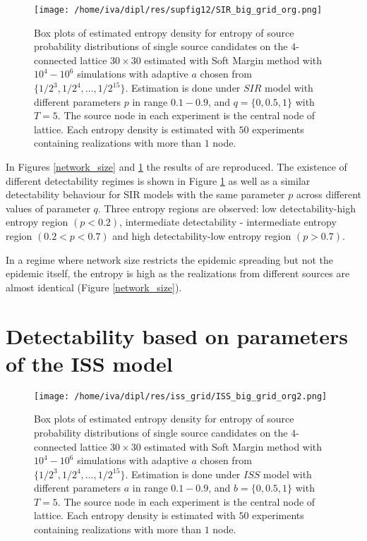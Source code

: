 \documentclass[times, utf8, diplomski]{fer}
\begin{document}
\begin{figure}[H]
\texttt{[image: /home/iva/dipl/res/supfig12/SIR\_big\_grid\_org.png]}
\caption{Box plots of estimated entropy density for entropy of source probability distributions of 
single source candidates on the $4$-connected lattice $30 \times 30$ estimated with Soft Margin method with $10^4 - 10^6$ simulations with adaptive $a$ chosen from $\{1/2^3, 1/2^4, \ldots, 1/2^{15}\}$. Estimation is done under $SIR$ model with different parameters $p$ in range $0.1 - 0.9$, and $q = \{0, 0.5, 1\}$ with $T = 5$. The source node in each experiment is the central node of lattice. Each entropy density is estimated with $50$ experiments containing realizations with more than $1$ node.}
\label{entropy_zones}
\end{figure}

In Figures \ref{network_size} and \ref{entropy_zones} the results of \cite{Nino} are reproduced. The existence of different detectability regimes is shown in Figure \ref{entropy_zones} as well as a similar detectability behaviour for SIR models with the same parameter $p$ across different values of parameter $q$.  Three entropy regions are observed: low detectability-high entropy region $(p < 0.2)$, intermediate detectability - intermediate entropy region $(0.2 < p < 0.7)$ and high detectability-low entropy region $(p > 0.7)$.

In a regime where network size restricts the epidemic spreading but not the epidemic itself, the entropy is high as the realizations from different sources are almost identical (Figure \ref{network_size}).

\section{Detectability based on parameters of the ISS model}
\begin{figure}[H]
\texttt{[image: /home/iva/dipl/res/iss\_grid/ISS\_big\_grid\_org2.png]}
\caption{Box plots of estimated entropy density for entropy of source probability distributions of 
single source candidates on the $4$-connected lattice $30 \times 30$ estimated with Soft Margin method with $10^4 - 10^6$ simulations with adaptive $a$ chosen from $\{1/2^3, 1/2^4, \ldots, 1/2^{15}\}$. Estimation is done under $ISS$ model with different parameters $a$ in range $0.1 - 0.9$, and $b = \{0, 0.5, 1\}$ with $T = 5$. The source node in each experiment is the central node of lattice. Each entropy density is estimated with $50$ experiments containing realizations with more than $1$ node.}
\end{figure}
\end{document}
